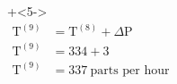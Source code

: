 \begin{frame}
\begin{columns}[T]
			\vspace{-1.1cm}
			
			\vspace{-2.8cm}
			
			\onslide+<5->{
				\begin{align*} 
					\text{T}^{(9)} &= \text{T}^{(8)} + \Delta \text{P} \\
					\text{T}^{(9)} &= 334 + 3 \\
					\text{T}^{(9)} &= 337 ~\text{parts per hour}
				\end{align*}
			}
			
			
			
	\end{columns}
\end{frame}

